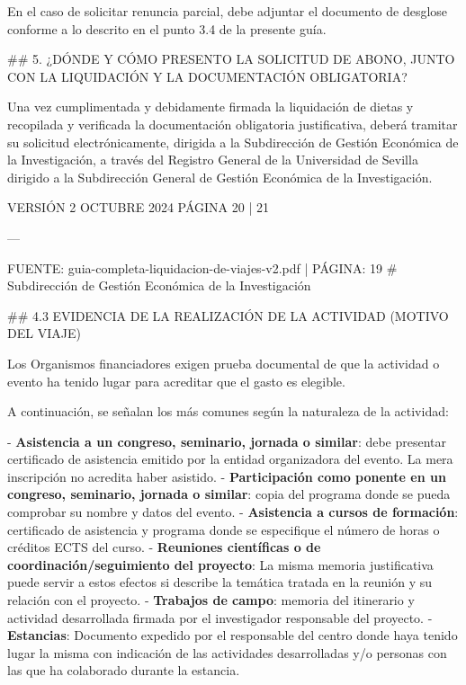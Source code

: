 \documentclass{article}
\begin{document}
\begin{itemize}
\begin{itemize}
\begin{scriptsize}
                  En el caso de solicitar renuncia parcial, debe adjuntar el documento de desglose conforme a lo descrito en el punto 3.4 de la presente guía.

                  \#\# 5. ¿DÓNDE Y CÓMO PRESENTO LA SOLICITUD DE ABONO, JUNTO CON LA LIQUIDACIÓN Y LA DOCUMENTACIÓN OBLIGATORIA?

                  Una vez cumplimentada y debidamente firmada la liquidación de dietas y recopilada y verificada la documentación obligatoria justificativa, deberá tramitar su solicitud electrónicamente, dirigida a la Subdirección de Gestión Económica de la Investigación, a través del Registro General de la Universidad de Sevilla dirigido a la Subdirección General de Gestión Económica de la Investigación.

                  VERSIÓN 2 OCTUBRE 2024    PÁGINA 20 | 21

                  ---

                  FUENTE: guia-completa-liquidacion-de-viajes-v2.pdf | PÁGINA: 19
                  \# Subdirección de Gestión Económica de la Investigación

                  \#\# 4.3 EVIDENCIA DE LA REALIZACIÓN DE LA ACTIVIDAD (MOTIVO DEL VIAJE)

                  Los Organismos financiadores exigen prueba documental de que la actividad o evento ha tenido lugar para acreditar que el gasto es elegible.

                  A continuación, se señalan los más comunes según la naturaleza de la actividad:

                  - \textbf{Asistencia a un congreso, seminario, jornada o similar}: debe presentar certificado de asistencia emitido por la entidad organizadora del evento. La mera inscripción no acredita haber asistido.
                  - \textbf{Participación como ponente en un congreso, seminario, jornada o similar}: copia del programa donde se pueda comprobar su nombre y datos del evento.
                  - \textbf{Asistencia a cursos de formación}: certificado de asistencia y programa donde se especifique el número de horas o créditos ECTS del curso.
                  - \textbf{Reuniones científicas o de coordinación/seguimiento del proyecto}: La misma memoria justificativa puede servir a estos efectos si describe la temática tratada en la reunión y su relación con el proyecto.
                  - \textbf{Trabajos de campo}: memoria del itinerario y actividad desarrollada firmada por el investigador responsable del proyecto.
                  - \textbf{Estancias}: Documento expedido por el responsable del centro donde haya tenido lugar la misma con indicación de las actividades desarrolladas y/o personas con las que ha colaborado durante la estancia.


\end{scriptsize}
\end{itemize}
\end{itemize}
\end{document}
